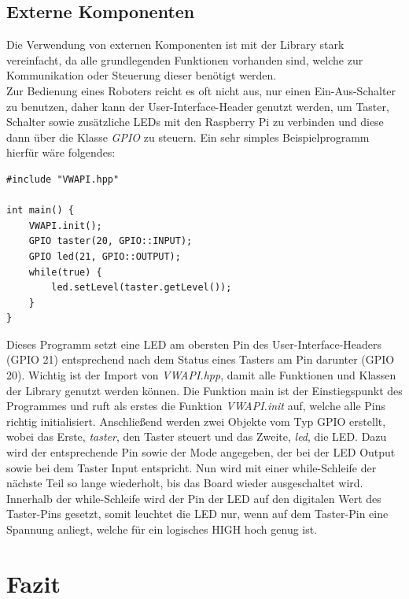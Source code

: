 \documentclass[12pt]{article}
\begin{document}
\subsection{Externe Komponenten}
Die Verwendung von externen Komponenten ist mit der Library stark vereinfacht, da alle grundlegenden Funktionen vorhanden sind, welche zur Kommunikation oder Steuerung dieser benötigt werden.\\
Zur Bedienung eines Roboters reicht es oft nicht aus, nur einen Ein-Aus-Schalter zu benutzen, daher kann der User-Interface-Header genutzt werden, um Taster, Schalter sowie zusätzliche LEDs mit den Raspberry Pi zu verbinden und diese dann über die Klasse \textit{GPIO} zu steuern. Ein sehr simples Beispielprogramm hierfür wäre folgendes:
\begin{verbatim}
#include "VWAPI.hpp"

int main() {
    VWAPI.init();
    GPIO taster(20, GPIO::INPUT);
    GPIO led(21, GPIO::OUTPUT);
    while(true) {
        led.setLevel(taster.getLevel());
    }
}
\end{verbatim}
\vspace{-2mm}
Dieses Programm setzt eine LED am obersten Pin des User-Interface-Headers (GPIO 21) entsprechend nach dem Status eines Tasters am Pin darunter (GPIO 20). Wichtig ist der Import von \textit{VWAPI.hpp}, damit alle Funktionen und Klassen der Library genutzt werden können. Die Funktion main ist der Einstiegspunkt des Programmes und ruft als erstes die Funktion \textit{VWAPI.init} auf, welche alle Pins richtig initialisiert. Anschließend werden zwei Objekte vom Typ GPIO erstellt, wobei das Erste, \textit{taster}, den Taster steuert und das Zweite, \textit{led}, die LED. Dazu wird der entsprechende Pin sowie der Mode angegeben, der bei der LED Output sowie bei dem Taster Input entspricht. Nun wird mit einer while-Schleife der nächste Teil so lange wiederholt, bis das Board wieder ausgeschaltet wird. Innerhalb  der while-Schleife wird der Pin der LED auf den digitalen Wert des Taster-Pins gesetzt, somit leuchtet die LED nur, wenn auf dem Taster-Pin eine Spannung anliegt, welche für ein logisches HIGH hoch genug ist.
\newpage\section{Fazit}
\end{document}
